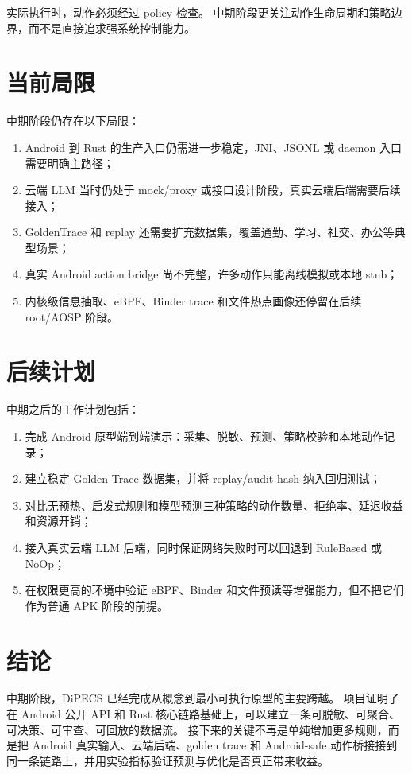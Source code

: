 \documentclass[12pt,a4paper]{article}
\begin{document}
实际执行时，动作必须经过 policy 检查。
中期阶段更关注动作生命周期和策略边界，而不是直接追求强系统控制能力。

\section{当前局限}\label{sec:limitations}

中期阶段仍存在以下局限：

\begin{enumerate}[label=(\arabic*)]
  \item Android 到 Rust 的生产入口仍需进一步稳定，JNI、JSONL 或 daemon 入口需要明确主路径；
  \item 云端 LLM 当时仍处于 mock/proxy 或接口设计阶段，真实云端后端需要后续接入；
  \item GoldenTrace 和 replay 还需要扩充数据集，覆盖通勤、学习、社交、办公等典型场景；
  \item 真实 Android action bridge 尚不完整，许多动作只能离线模拟或本地 stub；
  \item 内核级信息抽取、eBPF、Binder trace 和文件热点画像还停留在后续 root/AOSP 阶段。
\end{enumerate}

\section{后续计划}\label{sec:future}

中期之后的工作计划包括：

\begin{enumerate}[label=(\arabic*)]
  \item 完成 Android 原型端到端演示：采集、脱敏、预测、策略校验和本地动作记录；
  \item 建立稳定 Golden Trace 数据集，并将 replay/audit hash 纳入回归测试；
  \item 对比无预热、启发式规则和模型预测三种策略的动作数量、拒绝率、延迟收益和资源开销；
  \item 接入真实云端 LLM 后端，同时保证网络失败时可以回退到 RuleBased 或 NoOp；
  \item 在权限更高的环境中验证 eBPF、Binder 和文件预读等增强能力，但不把它们作为普通 APK 阶段的前提。
\end{enumerate}

\section{结论}\label{sec:conclusion}

中期阶段，DiPECS 已经完成从概念到最小可执行原型的主要跨越。
项目证明了在 Android 公开 API 和 Rust 核心链路基础上，可以建立一条可脱敏、可聚合、可决策、可审查、可回放的数据流。
接下来的关键不再是单纯增加更多规则，而是把 Android 真实输入、云端后端、golden trace 和 Android-safe 动作桥接接到同一条链路上，并用实验指标验证预测与优化是否真正带来收益。



\end{document}
